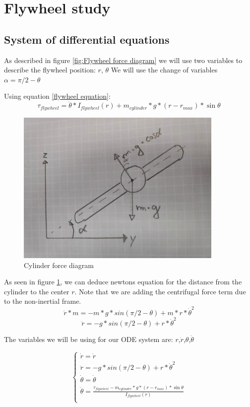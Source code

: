 \section{Flywheel study}

\subsection{System of differential equations}
As described in figure \ref{fig:Flywheel force diagram} we will use two variables to describe the flywheel position: $r$, $\theta$ 
We will use the change of variables $\alpha =\pi/2 - \theta$

Using equation \ref{flywheel equation}:
\[\tau_{flywheel} = \ddot{\theta}*I_{flywheel}(r) + m_{cylinder} * g * (r - r_{max}) * \sin{\theta}\]
\begin{figure}[ht]
	\centering
	\includegraphics[width=10cm]{img/cylinder_forces.png}
	\caption{Cylinder force diagram}
	\label{fig:Cylinder force diagram}
\end{figure}

As seen in figure \ref{fig:Cylinder force diagram}, we can deduce newtons equation for the distance from the cylinder to the center $r$. Note that we are adding the centrifugal force term due to the non-inertial frame.
\[\ddot{r} * m = -m * g * sin(\pi/2-\theta) + m * r * \dot{\theta}^2 \]
\[\ddot{r} = -g * sin(\pi/2-\theta) + r * \dot{\theta}^2 \]

The variables we will be using for our ODE system are: $r$,$\dot{r}$,$\theta$,$\dot{\theta}$


\[
\begin{cases}
    \dot{r} = \dot{r}\\
    \ddot{r} = -g * sin(\pi/2-\theta) + r * \dot{\theta}^2\\
    \dot{\theta} = \dot{\theta}\\
    \ddot{\theta} = \frac{\tau_{flywheel}-m_{cylinder} * g * (r - r_{max}) * \sin{\theta}}{I_{flywheel}(r)} \\    
\end{cases}
\]

